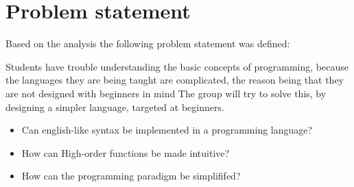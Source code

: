 \newpage
\section{Problem statement}
Based on the analysis the following problem statement was defined:
\begin{center}
	Students have trouble understanding the basic concepts of programming, because the languages they are being taught are complicated, the reason being that they are not designed with beginners in mind
	The group will try to solve this, by designing a simpler language, targeted at beginners.

\begin{itemize}
	\item Can english-like syntax be implemented in a programming language?
	\item How can High-order functions be made intuitive?
	\item How can the programming paradigm be simplififed?
\end{itemize}
\end{center}
